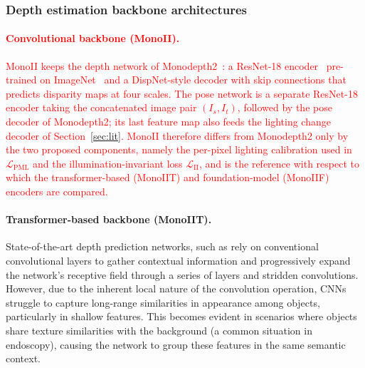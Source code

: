 \documentclass[a4paper,fleqn]{cas-dc}
\begin{document}
{\subsubsection{Depth estimation backbone architectures  \label{sec:Architectures}} 
%
\textcolor{red}{\paragraph{Convolutional backbone (MonoII).} MonoII keeps the depth network of Monodepth2~\citep{Godard_ICCV_2019}: a ResNet-18 encoder~\citep{He_CVPR_2016} pre-trained on ImageNet~\citep{Deng_CVPR_2009} and a DispNet-style decoder with skip connections that predicts disparity maps at four scales. The pose network is a separate ResNet-18 encoder taking the concatenated image pair $(I_s, I_t)$, followed by the pose decoder of Monodepth2; its last feature map also feeds the lighting change decoder of Section~\ref{sec:lit}. MonoII therefore differs from Monodepth2 only by the two proposed components, namely the per-pixel lighting calibration used in $\mathcal{L}_\textrm{PML}$ and the illumination-invariant loss $\mathcal{L}_\textrm{II}$, and is the reference with respect to which the transformer-based (MonoIIT) and foundation-model (MonoIIF) encoders are compared.}
%
\paragraph{Transformer-based backbone (MonoIIT).}
State-of-the-art depth prediction networks, such as \citep{Godard_ICCV_2019,Ozyoruk_MIA_2021,Shao_MIA_2022} rely on conventional convolutional layers to gather contextual information and progressively expand the network's receptive field through a series of layers and stridden convolutions. However, due to the inherent local nature of the convolution operation, CNNs struggle to capture long-range similarities in appearance among objects, particularly in shallow features. This becomes evident in scenarios where objects share texture similarities with the background (a common situation in endoscopy), causing the network to group these features in the same semantic context. 

}
\end{document}
